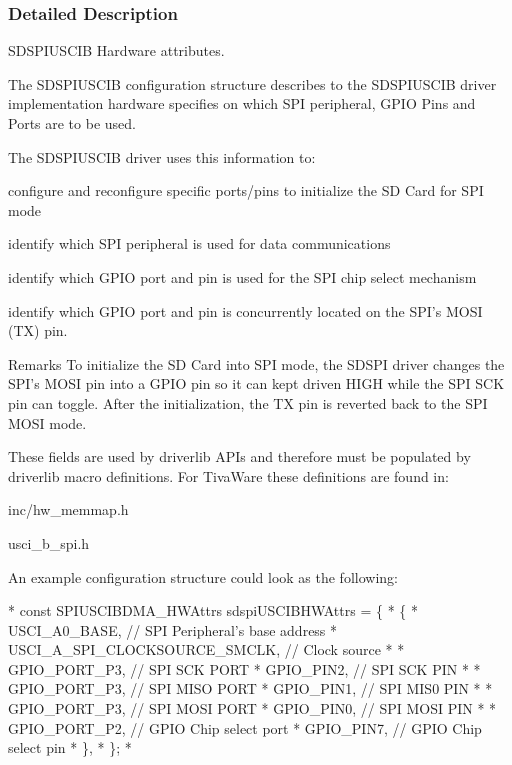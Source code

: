 \subsubsection{Detailed Description}
S\-D\-S\-P\-I\-U\-S\-C\-I\-B Hardware attributes. 

The S\-D\-S\-P\-I\-U\-S\-C\-I\-B configuration structure describes to the S\-D\-S\-P\-I\-U\-S\-C\-I\-B driver implementation hardware specifies on which S\-P\-I peripheral, G\-P\-I\-O Pins and Ports are to be used.

The S\-D\-S\-P\-I\-U\-S\-C\-I\-B driver uses this information to\-:
\begin{DoxyItemize}
\item configure and reconfigure specific ports/pins to initialize the S\-D Card for S\-P\-I mode
\item identify which S\-P\-I peripheral is used for data communications
\item identify which G\-P\-I\-O port and pin is used for the S\-P\-I chip select mechanism
\item identify which G\-P\-I\-O port and pin is concurrently located on the S\-P\-I's M\-O\-S\-I (T\-X) pin.
\end{DoxyItemize}

\begin{DoxyRemark}{Remarks}
To initialize the S\-D Card into S\-P\-I mode, the S\-D\-S\-P\-I driver changes the S\-P\-I's M\-O\-S\-I pin into a G\-P\-I\-O pin so it can kept driven H\-I\-G\-H while the S\-P\-I S\-C\-K pin can toggle. After the initialization, the T\-X pin is reverted back to the S\-P\-I M\-O\-S\-I mode.
\end{DoxyRemark}
These fields are used by driverlib A\-P\-Is and therefore must be populated by driverlib macro definitions. For Tiva\-Ware these definitions are found in\-:
\begin{DoxyItemize}
\item inc/hw\-\_\-memmap.\-h
\item usci\-\_\-b\-\_\-spi.\-h
\end{DoxyItemize}

An example configuration structure could look as the following\-: 
\begin{DoxyCode}
*  \textcolor{keyword}{const} SPIUSCIBDMA_HWAttrs sdspiUSCIBHWAttrs = \{
*      \{
*           USCI\_A0\_BASE, \textcolor{comment}{// SPI Peripheral's base address}
*           USCI\_A\_SPI\_CLOCKSOURCE\_SMCLK, \textcolor{comment}{// Clock source}
*
*           GPIO\_PORT\_P3,  \textcolor{comment}{// SPI SCK PORT}
*           GPIO\_PIN2,     \textcolor{comment}{// SPI SCK PIN}
*
*           GPIO\_PORT\_P3,  \textcolor{comment}{// SPI MISO PORT}
*           GPIO\_PIN1,     \textcolor{comment}{// SPI MIS0 PIN}
*
*           GPIO\_PORT\_P3,  \textcolor{comment}{// SPI MOSI PORT}
*           GPIO\_PIN0,     \textcolor{comment}{// SPI MOSI PIN}
*
*           GPIO\_PORT\_P2,  \textcolor{comment}{// GPIO Chip select port}
*           GPIO\_PIN7,     \textcolor{comment}{// GPIO Chip select pin}
*       \},
*  \};
*  
\end{DoxyCode}
 

